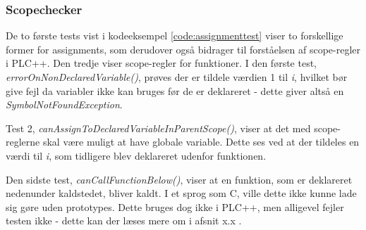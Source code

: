 \subsubsection{Scopechecker}


\noindent De to første tests vist i kodeeksempel \ref{code:assignmenttest} viser to forskellige former for assignments, som derudover også bidrager til forståelsen af scope-regler i PLC++. Den tredje viser scope-regler for funktioner. I den første test, \textit{errorOnNonDeclaredVariable()}, prøves der er tildele værdien 1 til \textit{i}, hvilket bør give fejl da variabler ikke kan bruges før de er deklareret - dette giver altså en \textit{SymbolNotFoundException}.

Test 2, \textit{canAssignToDeclaredVariableInParentScope()}, viser at det med scope-reglerne skal være muligt at have globale variable. Dette ses ved at der tildeles en værdi til \textit{i}, som tidligere blev deklareret udenfor funktionen.

Den sidste test, \textit{canCallFunctionBelow()}, viser at en funktion, som er deklareret nedenunder kaldstedet, bliver kaldt. I et sprog som C, ville dette ikke kunne lade sig gøre uden prototypes. Dette bruges dog ikke i PLC++, men alligevel fejler testen ikke - dette kan der læses mere om i afsnit x.x . 